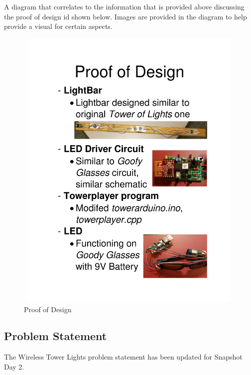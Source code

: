 \documentclass[12pt]{article}
\begin{document}
{{		A diagram that correlates to the information that is provided above discussing the proof of design id shown below. Images are provided in the diagram to help provide a visual for certain aspects.
	
		\begin{figure}[!htb]
			\centering
			\includegraphics[width = 120mm, height = 140mm]{assets/Proof_Of_Design.png}
			\caption{Proof of Design \label{overflow}}
		\end{figure}

	\clearpage
	
	\subsection{Problem Statement}
	The Wireless Tower Lights problem statement has been updated for Snapshot Day 2.
	
}}
\end{document}
